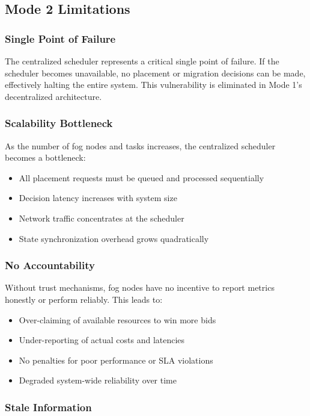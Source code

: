 \documentclass[12pt,a4paper]{article}
\begin{document}
\subsection{Mode 2 Limitations}

\subsubsection{Single Point of Failure}

The centralized scheduler represents a critical single point of failure. If the scheduler becomes unavailable, no placement or migration decisions can be made, effectively halting the entire system. This vulnerability is eliminated in Mode 1's decentralized architecture.

\subsubsection{Scalability Bottleneck}

As the number of fog nodes and tasks increases, the centralized scheduler becomes a bottleneck:
\begin{itemize}
    \item All placement requests must be queued and processed sequentially
    \item Decision latency increases with system size
    \item Network traffic concentrates at the scheduler
    \item State synchronization overhead grows quadratically
\end{itemize}

\subsubsection{No Accountability}

Without trust mechanisms, fog nodes have no incentive to report metrics honestly or perform reliably. This leads to:
\begin{itemize}
    \item Over-claiming of available resources to win more bids
    \item Under-reporting of actual costs and latencies
    \item No penalties for poor performance or SLA violations
    \item Degraded system-wide reliability over time
\end{itemize}

\subsubsection{Stale Information}
\end{document}
